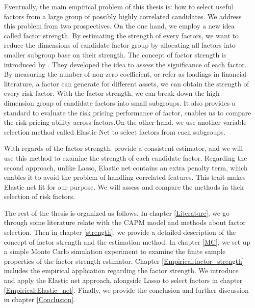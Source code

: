 Eventually, the main empirical problem of this thesis is: how to select useful factors from a large group of possibly highly correlated candidates.
We address this problem from two prospectives.
On the one hand, we employ a new idea called factor strength.
By estimating the strength of every factors, we want to reduce the dimensions of candidate factor group by allocating all factors into smaller subgroup base on their strength.
The concept of factor strength is introduced by .
They developed the idea to assess the significance of each factor.
By measuring the number of non-zero coefficient, or refer as loadings in financial literature, a factor can generate for different assets, we can obtain the strength of every risk factor.
With the factor strength, we can break down the high dimension group of candidate factors into small subgroups.
It also provides a standard to evaluate the risk pricing performance of factor, enables us to compare the risk-pricing ability across factors.On the other hand, we use another variable selection method called Elastic Net \cite{Zou2005} to select factors from each subgroups.

With regards of the factor strength,  provide a consistent estimator, and we will use this method to examine the strength of each candidate factor.
Regarding the second approach, unlike Lasso, Elastic net contains an extra penalty term, which enables it to avoid the problem of handling correlated features.
This trait makes Elastic net fit for our purpose.
We will assess and compare the methods in their selection of risk factors.

The rest of the thesis is organized as follows.
In chapter \ref{Literature}, we go through some literature relate with the CAPM model and methods about factor selection.
Then in chapter \ref{strength}, we provide a detailed description of the concept of factor strength and the estimation method.
In chapter \ref{MC}, we set up a simple Monte Carlo simulation experiment to examine the finite sample properties of the factor strength estimator.
Chapter \ref{Empirical:factor_strength} includes the empirical application regarding the factor strength.
We introduce and apply the Elastic net approach, alongside Lasso to select factors in chapter \ref{Empirical:Elastic_net}.
Finally, we provide the conclusion and further discussion in chapter \ref{Conclusion}.


